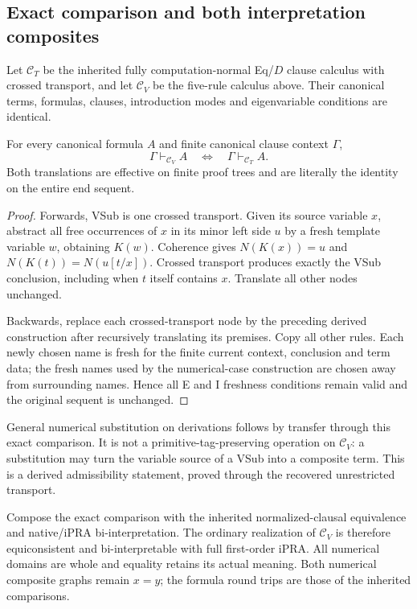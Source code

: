 \subsection{Exact comparison and both interpretation composites}

Let $\mathcal C_T$ be the inherited fully computation-normal Eq/$D$
clause calculus with crossed transport, and let $\mathcal C_V$ be the
five-rule calculus above. Their canonical terms, formulas, clauses,
introduction modes and eigenvariable conditions are identical.

\begin{theorem}
For every canonical formula $A$ and finite canonical clause context
$\Gamma$,
\[
       \Gamma\vdash_{\mathcal C_V}A
       \quad\Longleftrightarrow\quad
       \Gamma\vdash_{\mathcal C_T}A.
\]
Both translations are effective on finite proof trees and are literally
the identity on the entire end sequent.
\end{theorem}
\begin{proof}
Forwards, VSub is one crossed transport. Given its source variable $x$,
abstract all free occurrences of $x$ in its minor left side $u$ by a
fresh template variable $w$, obtaining $K(w)$. Coherence gives
$N(K(x))=u$ and $N(K(t))=N(u[t/x])$. Crossed transport produces
exactly the VSub conclusion, including when $t$ itself contains $x$.
Translate all other nodes unchanged.

Backwards, replace each crossed-transport node by the preceding
derived construction after recursively translating its premises. Copy
all other rules. Each newly chosen name is fresh for the finite current
context, conclusion and term data; the fresh names used by the numerical-case construction are chosen
away from surrounding names. Hence all E and I
freshness conditions remain valid and the original sequent is unchanged.
\end{proof}

General numerical substitution on derivations follows by transfer
through this exact comparison. It is not a primitive-tag-preserving
operation on $\mathcal C_V$: a substitution may turn the variable
source of a VSub into a composite term. This is a derived admissibility
statement, proved through the recovered unrestricted transport.

Compose the exact comparison with the inherited normalized-clausal
equivalence and native/iPRA bi-interpretation. The ordinary realization
of $\mathcal C_V$ is therefore equiconsistent and bi-interpretable with
full first-order iPRA. All numerical domains are whole and equality
retains its actual meaning. Both numerical composite graphs remain
$x=y$; the formula round trips are those of the inherited comparisons.

